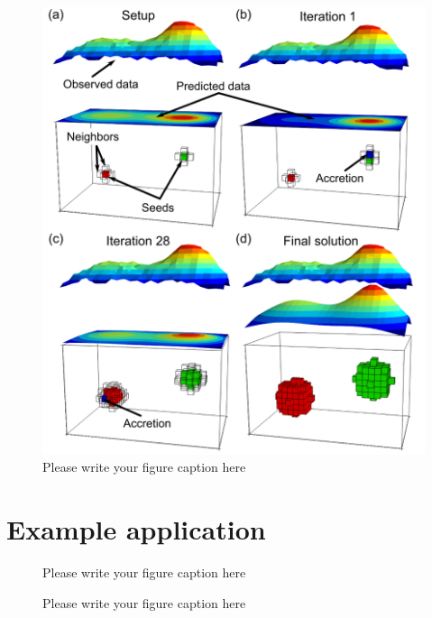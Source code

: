 \documentclass[twocolumn,final]{svjour3}
\begin{document}
\begin{figure}
    \includegraphics{fig/method}
    \caption{Please write your figure caption here}
    \label{fig:method}
\end{figure}

\section{Example application}


\begin{figure}
\caption{Please write your figure caption here}
\label{fig:1}       %
\end{figure}

\begin{figure}
\caption{Please write your figure caption here}
\label{fig:2}       %
\end{figure}
\end{document}

